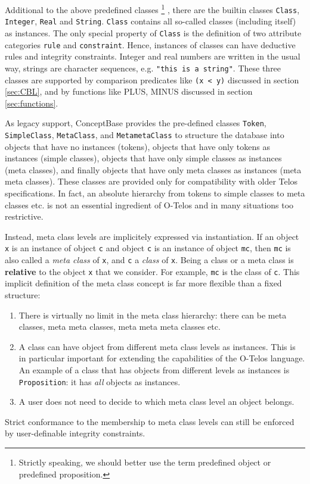 Additional to the above predefined classes%
\footnote{Strictly speaking, we should better use the term predefined object or
predefined proposition.}%
,
there are the builtin classes {\tt Class}, {\tt Integer}, {\tt Real} and {\tt String}.
{\tt Class} contains all so-called classes (including itself) as instances.
The only special property of {\tt Class} is the definition of two
attribute categories  {\tt rule} and {\tt constraint}.  Hence, instances of classes
can have deductive rules and integrity constraints.
Integer and real numbers are written in the usual way, strings are
character sequences, e.g. {\tt "this is a string"}.
These three classes are supported by comparison predicates like
{\tt (x < y)} discussed in section \ref{sec:CBL}, and by functions like
PLUS, MINUS discussed in section \ref{sec:functions}.

As legacy support, ConceptBase provides the pre-defined classes {\tt Token},
{\tt SimpleClass}, {\tt Meta\-Class}, and {\tt MetametaClass}
 to structure the database
into objects that have no instances (tokens), objects that have only tokens as
instances (simple classes), objects that have only simple classes as instances (meta classes),
and finally objects that have only meta classes as instances (meta meta classes).
These classes are provided only for
compatibility with older Telos specifications.  In fact, an absolute hierarchy from
tokens to simple classes to meta classes etc. is not an essential
ingredient of O-Telos and in many situations too restrictive.

Instead, meta class levels are
implicitely expressed via instantiation. If an object {\tt x} is an
instance of object {\tt c} and object {\tt c} is an instance of
object {\tt mc}, then {\tt mc} is also called a {\em meta class\/} of
{\tt x}, and {\tt c} a {\em class\/} of {\tt x}. Being a class or
a meta class is {\bf relative} to the object {\tt x} that we consider.
For example, {\tt mc} is the class of {\tt c}.
This implicit definition of the meta class concept is far more flexible
than a fixed structure:
\begin{enumerate}
\item There is virtually no limit in the meta class hierarchy: there can be meta
classes, meta meta classes, meta meta meta classes etc.
\item A class can have object from different meta class levels as instances.
This is in particular important for extending the capabilities of the O-Telos
language. An example of a class that has objects from different levels as
instances is {\tt Proposition}: it has {\em all\/} objects as instances.
\item A user does not need to decide to which meta class level
an object belongs.
\end{enumerate}
Strict conformance to the membership to meta class levels can still be enforced
by user-definable integrity constraints.



